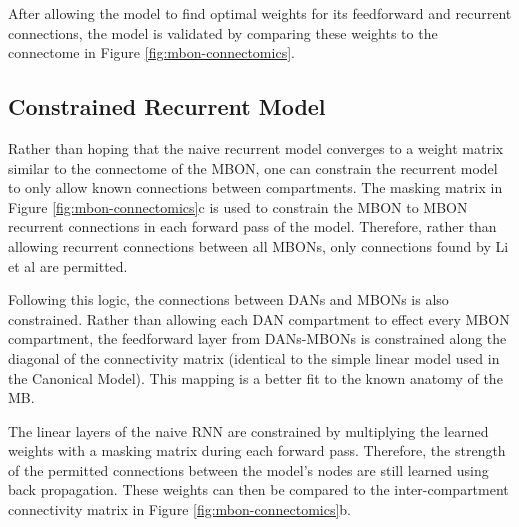 \documentclass[11pt, A4]{article}
\begin{document}
\begin{multicols}{2}
After allowing the model to find optimal weights for its feedforward and recurrent connections, the model is validated by comparing these weights to the connectome in Figure \ref{fig:mbon-connectomics}. 


		

\subsection{Constrained Recurrent Model}
Rather than hoping that the naive recurrent model converges to a weight matrix similar to the connectome of the MBON, one can constrain the recurrent model to only allow known connections between compartments. The masking matrix in Figure \ref{fig:mbon-connectomics}c is used to constrain the MBON to MBON recurrent connections in each forward pass of the model. Therefore, rather than allowing recurrent connections between all MBONs, only connections found by Li et al \cite{li2020connectome} are permitted. 

Following this logic, the connections between DANs and MBONs is also constrained. Rather than allowing each DAN compartment to effect every MBON compartment, the feedforward layer from DANs-MBONs is constrained along the diagonal of the connectivity matrix (identical to the simple linear model used  in the Canonical Model). This mapping is a better fit to the known anatomy of the MB. 


The linear layers of the naive RNN are constrained by multiplying the learned weights with a masking matrix during each forward pass. Therefore, the strength of the permitted connections between the model's nodes are still learned using back propagation. These weights can then be compared to the inter-compartment connectivity matrix in Figure \ref{fig:mbon-connectomics}b.



\end{multicols}
\end{document}

